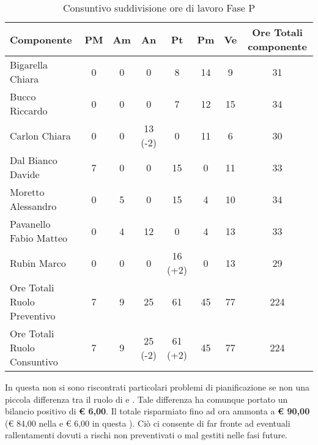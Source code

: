 			\begin{table}[H]
				\begin{center}
					\begin{tabular}{| l | c | c | c | c | c | c | c |}
						\hline
						Componente 					& PM	& Am 	& An 	& Pt 		& Pm 		& Ve 	& Ore Totali componente \\ \hline
						
						Bigarella Chiara 			& 0		& 0		& 0		& 8 		& 14 		& 9 		& 31 \\
						Bucco Riccardo 				& 0		& 0		& 0		& 7 		& 12		& 15 		& 34 \\
						Carlon Chiara	 			& 0		& 0		& 13 (-2) & 0			& 11 		& 6 		& 30 \\
						Dal Bianco Davide 			& 7 	& 0		& 0		& 15 		& 0			& 11 		& 33 \\
						Moretto Alessandro 			& 0		& 5 	& 0		& 15 		& 4 		& 10 		& 34 \\
						Pavanello Fabio Matteo	 	& 0		& 4		& 12 	& 0			& 4 		& 13 		& 33 \\
						Rubin Marco					& 0		& 0 	& 0		& 16 (+2)	& 0			& 13 		& 29 \\ \hline \hline
						
						Ore Totali Ruolo Preventivo & 7 	& 9 	& 25 	& 61 		& 45 		& 77 		& 224	\\ 
						Ore Totali Ruolo Consuntivo & 7 	& 9 	& 25 (-2) & 61 (+2)	& 45 		& 77 		& 224	\\ \hline
					\end{tabular}
				\end{center}
				\caption{Consuntivo suddivisione ore di lavoro Fase P}
			\end{table}

			In questa  non si sono riscontrati particolari problemi di pianificazione se non una piccola differenza tra il ruolo di  e . Tale differenza ha comunque portato un bilancio positivo di \textbf{\euro{} 6,00}.
			Il totale risparmiato fino ad ora ammonta a \textbf{\euro{} 90,00} (\euro{} 84,00 nella  e \euro{} 6,00 in questa ). Ciò ci consente di far fronte ad eventuali rallentamenti dovuti a rischi non preventivati o mal gestiti nelle fasi future.
	

								
